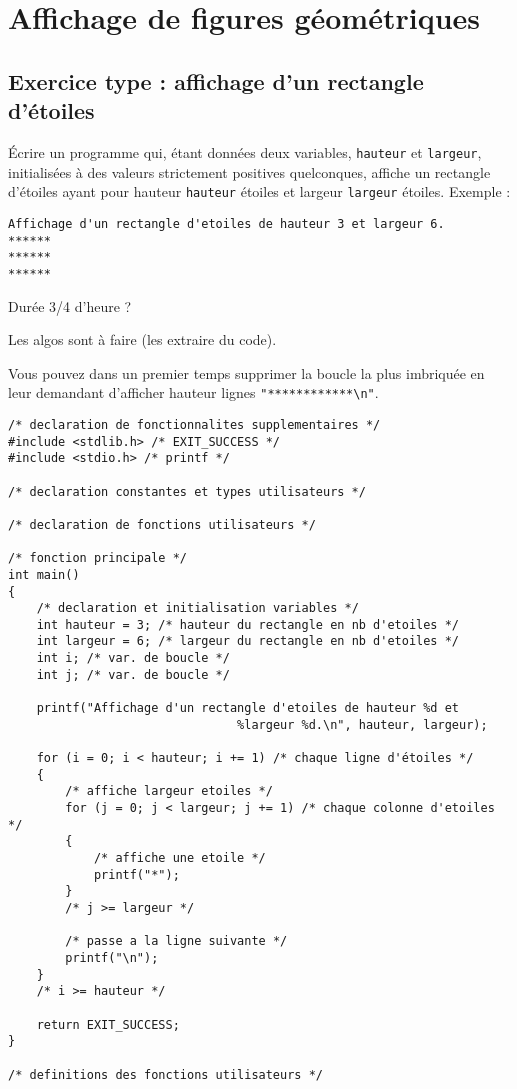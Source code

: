 % 

\section{Affichage de figures géométriques}


\subsection{Exercice type : affichage d'un rectangle d'étoiles}

Écrire un programme  qui, étant données deux variables,
\verb|hauteur| et \verb|largeur|, initialisées à des valeurs
strictement positives quelconques, affiche un rectangle d'étoiles ayant pour
hauteur \verb|hauteur| étoiles et largeur \verb|largeur|
étoiles. Exemple :
\begin{verbatim}
Affichage d'un rectangle d'etoiles de hauteur 3 et largeur 6.
******
******
******
\end{verbatim}

\begin{correction}
Durée 3/4 d'heure ?

Les algos sont à faire (les extraire du code).

Vous pouvez dans un premier temps supprimer la boucle la plus
imbriquée en leur demandant d'afficher hauteur lignes  \verb|"************\n"|.

\begin{verbatim}
/* declaration de fonctionnalites supplementaires */
#include <stdlib.h> /* EXIT_SUCCESS */
#include <stdio.h> /* printf */

/* declaration constantes et types utilisateurs */

/* declaration de fonctions utilisateurs */

/* fonction principale */
int main()
{
    /* declaration et initialisation variables */
    int hauteur = 3; /* hauteur du rectangle en nb d'etoiles */
    int largeur = 6; /* largeur du rectangle en nb d'etoiles */
    int i; /* var. de boucle */
    int j; /* var. de boucle */

    printf("Affichage d'un rectangle d'etoiles de hauteur %d et
                                %largeur %d.\n", hauteur, largeur);

    for (i = 0; i < hauteur; i += 1) /* chaque ligne d'étoiles */
    {
        /* affiche largeur etoiles */
        for (j = 0; j < largeur; j += 1) /* chaque colonne d'etoiles */
        {
            /* affiche une etoile */
            printf("*");
        }
        /* j >= largeur */

        /* passe a la ligne suivante */
        printf("\n");
    }
    /* i >= hauteur */

    return EXIT_SUCCESS;
}

/* definitions des fonctions utilisateurs */
\end{verbatim}
\end{correction}

